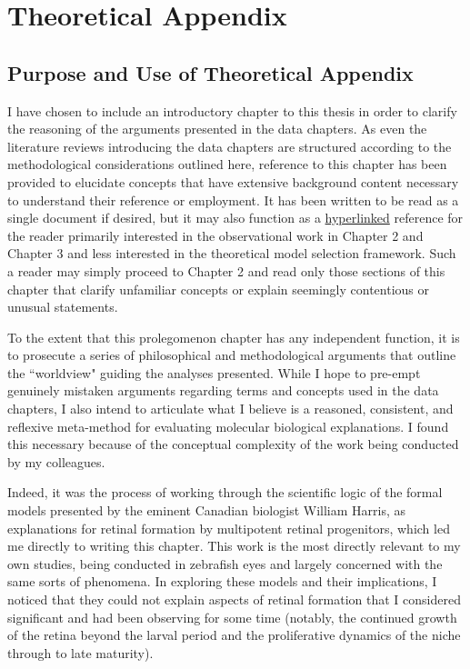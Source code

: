 \chapter{Theoretical Appendix}

\section{Purpose and Use of Theoretical Appendix}
I have chosen to include an introductory chapter to this thesis in order to clarify the reasoning of the arguments presented in the data chapters. As even the literature reviews introducing the data chapters are structured according to the methodological considerations outlined here, reference to this chapter has been provided to elucidate concepts that have extensive background content necessary to understand their reference or employment. It has been written to be read as a single document if desired, but it may also function as a \hyperref[hyperlink]{hyperlinked} reference for the reader primarily interested in the observational work in Chapter 2 and Chapter 3 and less interested in the theoretical model selection framework. Such a reader may simply proceed to Chapter 2 and read only those sections of this chapter that clarify unfamiliar concepts or explain seemingly contentious or unusual statements.

To the extent that this prolegomenon chapter has any independent function, it is to prosecute a series of philosophical and methodological arguments that outline the ``worldview" guiding the analyses presented. While I hope to pre-empt genuinely mistaken arguments regarding terms and concepts used in the data chapters, I also intend to articulate what I believe is a reasoned, consistent, and reflexive meta-method for evaluating molecular biological explanations. I found this necessary because of the conceptual complexity of the work being conducted by my colleagues.

Indeed, it was the process of working through the scientific logic of the formal models presented by the eminent Canadian biologist William Harris, as explanations for retinal formation by multipotent retinal progenitors, which led me directly to writing this chapter. This work is the most directly relevant to my own studies, being conducted in zebrafish eyes and largely concerned with the same sorts of phenomena. In exploring these models and their implications, I noticed that they could not explain aspects of retinal formation that I considered significant and had been observing for some time (notably, the continued growth of the retina beyond the larval period and the proliferative dynamics of the niche through to late maturity).

